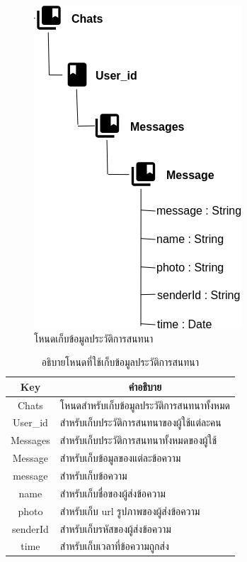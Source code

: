 \newpage
\begin{figure}[H]
	\centering
	\includegraphics[width=0.4\columnwidth]
	{Figures/3/DB/nodeChat}
	\caption{โหนดเก็บข้อมูลประวัติการสนทนา}
	\label{Fig:DB4}
\end{figure}
\begin{table}[H]
	\centering
	\caption{อธิบายโหนดที่ใช้เก็บข้อมูลประวัติการสนทนา}
	\label{my-label1}
	\begin{tabular}{|c|p{10cm}|}
		\hline
		\multicolumn{1}{|c|}{\textbf{Key}} & \multicolumn{1}{c|}{\textbf{คำอธิบาย}} \\ \hline
		Chats & โหนดสำหรับเก็บข้อมูลประวัติการสนทนาทั้งหมด \\ \hline
		User\_id &  สำหรับเก็บประวัติการสนทนาของผู้ใช้แต่ละคน \\ \hline
		Messages & สำหรับเก็บประวัติการสนทนาทั้งหมดของผู้ใช้ \\ \hline
		Message & สำหรับเก็บข้อมูลของแต่ละข้อความ \\ \hline
		message & สำหรับเก็บข้อความ \\ \hline
		name & สำหรับเก็บชื่อของผู้ส่งข้อความ\\ \hline
		photo & สำหรับเก็บ url รูปภาพของผู้ส่งข้อความ\\ \hline
		senderId & สำหรับเก็บรหัสของผู้ส่งข้อความ\\ \hline
		time & สำหรับเก็บเวลาที่ข้อความถูกส่ง\\ \hline
	\end{tabular}
\end{table}

